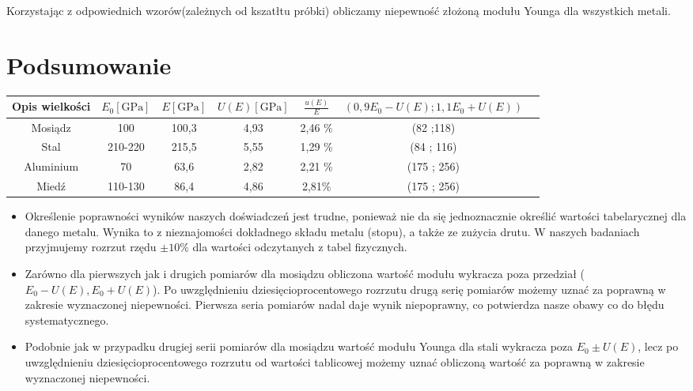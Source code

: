 \documentclass [a4paper,11pt]{article}
\begin{document}
	Korzystając z odpowiednich wzorów(zależnych od kszatłtu próbki) obliczamy niepewność złożoną modułu Younga dla wszystkich metali. 

		

	\section{Podsumowanie}
	\begin{center}
		\begin{tabular}{|c|c|c|c|c|c|c|}
			\hline Opis wielkości & $ E_0 \left[ \text{GPa} \right]$ & $E \left[ \text{GPa} \right]$ & $U(E) \left[ \text{GPa} \right]$ & $ \frac{u(E)}{E} $& $(0,9E_0-U(E); 1,1E_0 + U(E))$\\
			\hline Mosiądz  & 100 &  100,3& 4,93 & 2,46 \% & (82 ;118) \\
			\hline Stal & 210-220 & 215,5 & 5,55 & 1,29 \% & (84 ; 116) \\  
			\hline Aluminium& 70 &  63,6&2,82  &  2,21 \% & (175 ; 256)\\ 
			\hline  Miedź& 110-130 & 86,4  &  4,86 & 2,81\% & (175 ; 256)\\ 
			\hline 
		\end{tabular} 
	\end{center}
\vspace{1em}

\begin{itemize}
	\item Określenie poprawności wyników naszych doświadczeń jest trudne, ponieważ nie da się jednoznacznie określić wartości tabelarycznej dla danego metalu. Wynika to z nieznajomości dokładnego składu metalu (stopu), a także ze zużycia drutu. W naszych badaniach przyjmujemy rozrzut rzędu $\pm10\%$ dla wartości odczytanych z tabel fizycznych.
	
	\item Zarówno dla pierwszych jak i drugich pomiarów dla mosiądzu obliczona wartość modułu wykracza poza przedział ($E_0-U(E), E_0+U(E)$). Po uwzględnieniu dziesięcioprocentowego rozrzutu drugą serię pomiarów możemy uznać za poprawną w zakresie wyznaczonej niepewności. Pierwsza seria pomiarów nadal daje wynik niepoprawny, co potwierdza nasze obawy co do błędu systematycznego.
	
	\item Podobnie jak w przypadku drugiej serii pomiarów dla mosiądzu wartość modułu Younga dla stali wykracza poza $E_0 \pm U(E)$, lecz po uwzględnieniu dziesięcioprocentowego rozrzutu od wartości tablicowej możemy uznać obliczoną wartość za poprawną w zakresie wyznaczonej niepewności.
	
\end{itemize}
\end{document}
